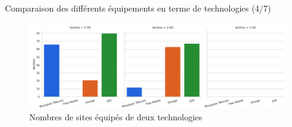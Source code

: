 \begin{frame}{Comparaison des différents équipements en terme de technologies (4/7)}
    \begin{figure}
        \includegraphics[height=0.4\paperheight]{images/barplots/2-xG.png}
        \caption{\label{fig:2-xG}Nombres de sites équipés de deux technologies}
    \end{figure}
\end{frame}

